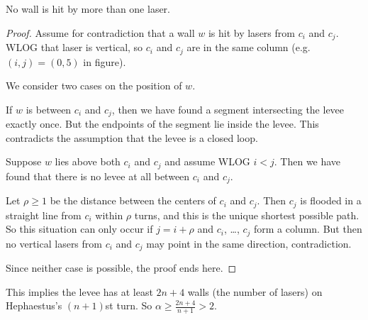 \begin{claim*}
  No wall is hit by more than one laser.
\end{claim*}
\begin{proof}
  Assume for contradiction that a wall $w$ is hit
  by lasers from $c_i$ and $c_j$.
  WLOG that laser is vertical, so
  $c_i$ and $c_j$ are in the same column
  (e.g.\ $(i,j) = (0,5)$ in figure).

  We consider two cases on the position of $w$.
  \begin{itemize}
    \ii If $w$ is between $c_i$ and $c_j$,
    then we have found a segment intersecting
    the levee exactly once.
    But the endpoints of the segment lie inside the levee.
    This contradicts the assumption that the levee is a closed loop.

    \ii Suppose $w$ lies above both $c_i$ and $c_j$
    and assume WLOG $i < j$.
    Then we have found that there is no levee at all
    between $c_i$ and $c_j$.

    Let $\rho \ge 1$ be the distance between
    the centers of $c_i$ and $c_j$.
    Then $c_j$ is flooded in a straight line from $c_i$
    within $\rho$ turns, and this is the unique
    shortest possible path.
    So this situation can only occur if $j = i+\rho$
    and $c_i$, \dots, $c_j$ form a column.
    But then no vertical lasers from $c_i$ and $c_j$
    may point in the same direction, contradiction.
  \end{itemize}
  Since neither case is possible, the proof ends here.
\end{proof}

This implies the levee has at least $2n+4$ walls
(the number of lasers) on Hephaestus's $(n+1)$st turn.
So $\alpha \ge \frac{2n+4}{n+1} > 2$.

